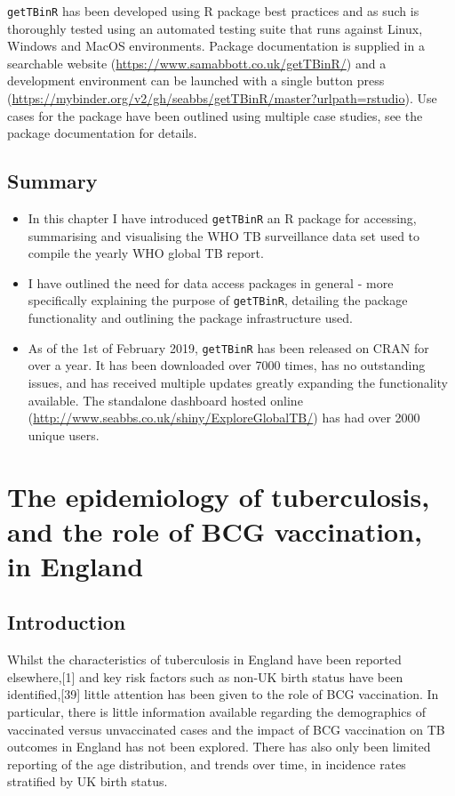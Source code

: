 \documentclass[11pt,twoside]{bristolthesis}
\begin{document}
  \texttt{getTBinR} has been developed using R package best practices and as such is thoroughly tested using an automated testing suite that runs against Linux, Windows and MacOS environments. Package documentation is supplied in a searchable website (\url{https://www.samabbott.co.uk/getTBinR/}) and a development environment can be launched with a single button press (\url{https://mybinder.org/v2/gh/seabbs/getTBinR/master?urlpath=rstudio}). Use cases for the package have been outlined using multiple case studies, see the package documentation for details.
  
  \hypertarget{summary-2}{%
  \section{Summary}\label{summary-2}}
  \begin{itemize}
  \item
    In this chapter I have introduced \texttt{getTBinR} an R package for accessing, summarising and visualising the WHO TB surveillance data set used to compile the yearly WHO global TB report.
  \item
    I have outlined the need for data access packages in general - more specifically explaining the purpose of \texttt{getTBinR}, detailing the package functionality and outlining the package infrastructure used.
  \item
    As of the 1st of February 2019, \texttt{getTBinR} has been released on CRAN for over a year. It has been downloaded over 7000 times, has no outstanding issues, and has received multiple updates greatly expanding the functionality available. The standalone dashboard hosted online (\url{http://www.seabbs.co.uk/shiny/ExploreGlobalTB/}) has had over 2000 unique users.
  \end{itemize}
  \hypertarget{data}{%
  \chapter{The epidemiology of tuberculosis, and the role of BCG vaccination, in England}\label{data}}
  
  \hypertarget{introduction-2}{%
  \section{Introduction}\label{introduction-2}}
  
  Whilst the characteristics of tuberculosis in England have been reported elsewhere,{[}1{]} and key risk factors such as non-UK birth status have been identified,{[}39{]} little attention has been given to the role of BCG vaccination. In particular, there is little information available regarding the demographics of vaccinated versus unvaccinated cases and the impact of BCG vaccination on TB outcomes in England has not been explored. There has also only been limited reporting of the age distribution, and trends over time, in incidence rates stratified by UK birth status.
  
\end{document}
